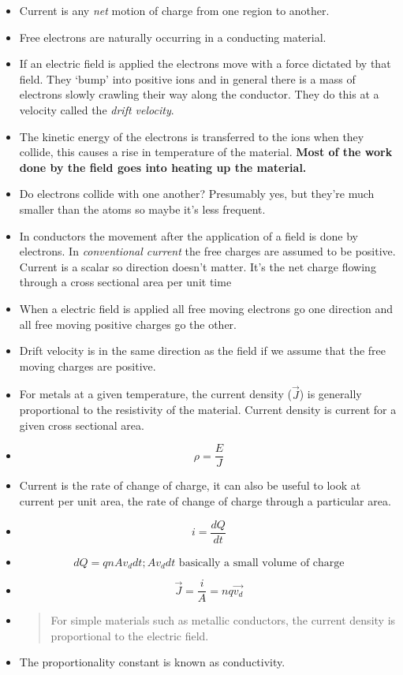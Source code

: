 \documentclass[11pt]{article}
\begin{document}
\begin{itemize}
\item
  Current is any \emph{net} motion of charge from one region to another.
\item
  Free electrons are naturally occurring in a conducting material.
\item
  If an electric field is applied the electrons move with a force
  dictated by that field. They `bump' into positive ions and in general
  there is a mass of electrons slowly crawling their way along the
  conductor. They do this at a velocity called the \emph{drift
  velocity}.
\item
  The kinetic energy of the electrons is transferred to the ions when
  they collide, this causes a rise in temperature of the material.
  \textbf{Most of the work done by the field goes into heating up the
  material.}
\item
  Do electrons collide with one another? Presumably yes, but they're
  much smaller than the atoms so maybe it's less frequent.
\item
  In conductors the movement after the application of a field is done by
  electrons. In \emph{conventional current} the free charges are assumed
  to be positive. Current is a scalar so direction doesn't matter. It's
  the net charge flowing through a cross sectional area per unit time
\item
  When a electric field is applied all free moving electrons go one
  direction and all free moving positive charges go the other.
\item
  Drift velocity is in the same direction as the field if we assume that
  the free moving charges are positive.
\item
  For metals at a given temperature, the current density (\(\vec{J}\))
  is generally proportional to the resistivity of the material. Current
  density is current for a given cross sectional area.
\item
  \[\rho = \frac{E}{J}\]
\item
  Current is the rate of change of charge, it can also be useful to look
  at current per unit area, the rate of change of charge through a
  particular area.
\item
  \[i = \frac{dQ}{dt}\]
\item
  \[dQ = qnAv_ddt; Av_ddt \text{ basically a small volume of charge}\]
\item
  \[\vec{J} = \frac{i}{A} = nq\vec{v_d}\]
\item
  \begin{quote}
  For simple materials such as metallic conductors, the current density
  is proportional to the electric field.
  \end{quote}
\item
  The proportionality constant is known as conductivity.
\end{itemize}
\end{document}
